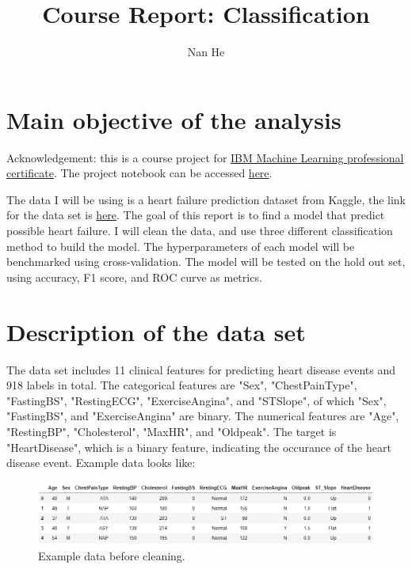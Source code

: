 \documentclass[11pt]{article}
\title{Course Report: Classification}
\author{Nan He}
\date{}
\begin{document}
\maketitle


\section{Main objective of the analysis}\label{section-introduction-1}
Acknowledgement: this is a course project for \href{https://www.coursera.org/professional-certificates/ibm-machine-learning}{IBM Machine Learning professional certificate}. The project notebook can be accessed \href{https://github.com/henankf223/Assignment_3/blob/cddb6fe0d2dcb9b413ce74028301c65b87316e8b/Assignment_Classification.ipynb}{here}.

The data I will be using is a heart failure prediction dataset from Kaggle, the link for the data set is \href{https://www.kaggle.com/fedesoriano/heart-failure-prediction}{here}.
The goal of this report is to find a model that predict possible heart failure.
I will clean the data, and use three different classification method to build the model.
The hyperparameters of each model will be benchmarked using cross-validation.
The model will be tested on the hold out set, using accuracy, F1 score, and ROC curve as metrics.

\section{Description of the data set}\label{section-introduction-2}
The data set includes 11 clinical features for predicting heart disease events and 918 labels in total.
The categorical features are "Sex", "ChestPainType", "FastingBS", "RestingECG", "ExerciseAngina", and "ST\textunderscore Slope", of which "Sex", "FastingBS", and "ExerciseAngina" are binary.
The numerical features are "Age", "RestingBP", "Cholesterol", "MaxHR", and "Oldpeak".
The target is "HeartDisease", which is a binary feature, indicating the occurance of the heart disease event.
Example data looks like:

\begin{figure}[h]
\centerline{\includegraphics[scale=0.5]{cls1.png}}
\caption{Example data before cleaning.}
\end{figure}
\end{document}
